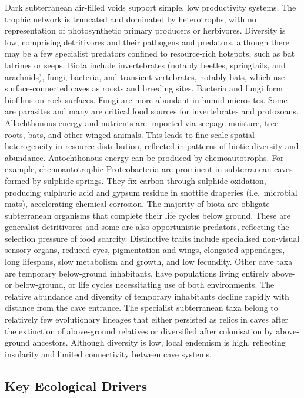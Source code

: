 \documentclass[
  letterpaper,
  DIV=11,
  numbers=noendperiod]{scrartcl}
\begin{document}
Dark subterranean air-filled voids support simple, low productivity
systems. The trophic network is truncated and dominated by heterotrophs,
with no representation of photosynthetic primary producers or
herbivores. Diversity is low, comprising detritivores and their
pathogens and predators, although there may be a few specialist
predators confined to resource-rich hotspots, such as bat latrines or
seeps. Biota include invertebrates (notably beetles, springtails, and
arachnids), fungi, bacteria, and transient vertebrates, notably bats,
which use surface-connected caves as roosts and breeding sites. Bacteria
and fungi form biofilms on rock surfaces. Fungi are more abundant in
humid microsites. Some are parasites and many are critical food sources
for invertebrates and protozoans. Allochthonous energy and nutrients are
imported via seepage moisture, tree roots, bats, and other winged
animals. This leads to fine-scale spatial heterogeneity in resource
distribution, reflected in patterns of biotic diversity and abundance.
Autochthonous energy can be produced by chemoautotrophs. For example,
chemoautotrophic Proteobacteria are prominent in subterranean caves
formed by sulphide springs. They fix carbon through sulphide oxidation,
producing sulphuric acid and gypsum residue in snottite draperies
(i.e.~microbial mats), accelerating chemical corrosion. The majority of
biota are obligate subterranean organisms that complete their life
cycles below ground. These are generalist detritivores and some are also
opportunistic predators, reflecting the selection pressure of food
scarcity. Distinctive traits include specialised non-visual sensory
organs, reduced eyes, pigmentation and wings, elongated appendages, long
lifespans, slow metabolism and growth, and low fecundity. Other cave
taxa are temporary below-ground inhabitants, have populations living
entirely above- or below-ground, or life cycles necessitating use of
both environments. The relative abundance and diversity of temporary
inhabitants decline rapidly with distance from the cave entrance. The
specialist subterranean taxa belong to relatively few evolutionary
lineages that either persisted as relics in caves after the extinction
of above-ground relatives or diversified after colonisation by
above-ground ancestors. Although diversity is low, local endemism is
high, reflecting insularity and limited connectivity between cave
systems.

\subsection{Key Ecological Drivers}\label{key-ecological-drivers-59}
\end{document}

